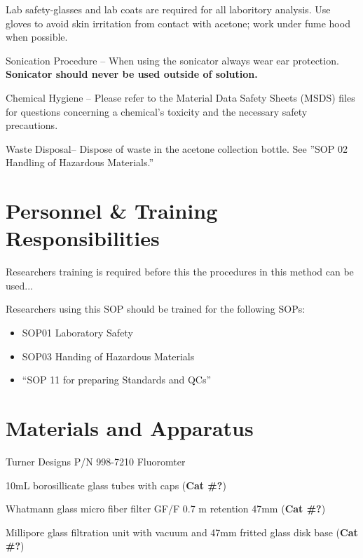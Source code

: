 \documentclass[12pt]{../SOP3_alpha}
\begin{document}
\NP Lab safety-glasses and lab coats are required for all laboritory analysis. Use gloves to avoid skin irritation from contact with acetone; work under fume hood when possible. 

\NP Sonication Procedure -- When using the sonicator always wear ear protection. \textbf {Sonicator should never be used outside of solution.}

\NP Chemical Hygiene -- Please refer to the Material Data Safety Sheets (MSDS) files for questions concerning a chemical's toxicity and the necessary safety precautions.

\NP Waste Disposal-- Dispose of waste in the acetone collection bottle. See ''SOP 02 Handling of Hazardous Materials.'' %

\section{Personnel \& Training Responsibilities}

\NP Researchers training is required before this the procedures in this method can be used... 

\NP Researchers using this SOP should be trained for the following SOPs:

\begin{itemize}
  \item SOP01 Laboratory Safety
  \item SOP03 Handing of Hazardous Materials
\item ``SOP 11 for preparing Standards and QCs'' %
\end{itemize}

\section{Materials and Apparatus}

\NP Turner Designs P/N 998-7210 Fluoromter

\NP 10mL borosillicate glass tubes with caps (\textbf{Cat \#?})

\NP Whatmann glass micro fiber filter GF/F 0.7 \micro m retention 47mm (\textbf{Cat \#?})

\NP Millipore glass filtration unit with vacuum and 47mm fritted glass disk base (\textbf{Cat \#?})
\end{document}
